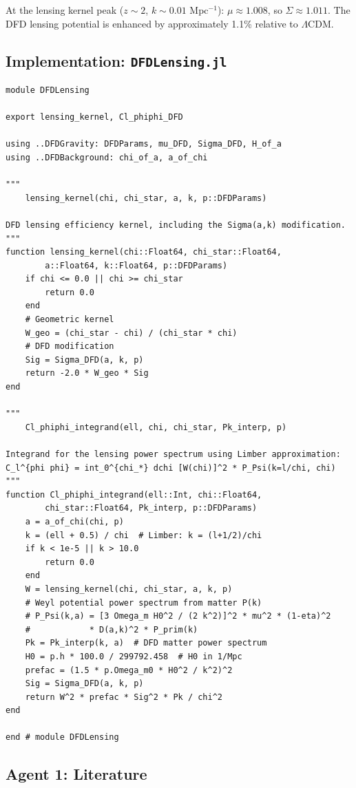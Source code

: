 \documentclass[11pt,a4paper]{article}
\begin{document}
At the lensing kernel peak ($z \sim 2$, $k \sim 0.01$ Mpc$^{-1}$): $\mu \approx 1.008$, so $\Sigma \approx 1.011$. The DFD lensing potential is enhanced by approximately 1.1\% relative to $\Lambda$CDM.

\subsection{Implementation: \texttt{DFDLensing.jl}}

\begin{lstlisting}[caption={DFDLensing.jl --- Lensing potential from dynamical $\psi$-field}]
module DFDLensing

export lensing_kernel, Cl_phiphi_DFD

using ..DFDGravity: DFDParams, mu_DFD, Sigma_DFD, H_of_a
using ..DFDBackground: chi_of_a, a_of_chi

"""
    lensing_kernel(chi, chi_star, a, k, p::DFDParams)

DFD lensing efficiency kernel, including the Sigma(a,k) modification.
"""
function lensing_kernel(chi::Float64, chi_star::Float64,
        a::Float64, k::Float64, p::DFDParams)
    if chi <= 0.0 || chi >= chi_star
        return 0.0
    end
    # Geometric kernel
    W_geo = (chi_star - chi) / (chi_star * chi)
    # DFD modification
    Sig = Sigma_DFD(a, k, p)
    return -2.0 * W_geo * Sig
end

"""
    Cl_phiphi_integrand(ell, chi, chi_star, Pk_interp, p)

Integrand for the lensing power spectrum using Limber approximation:
C_l^{phi phi} = int_0^{chi_*} dchi [W(chi)]^2 * P_Psi(k=l/chi, chi)
"""
function Cl_phiphi_integrand(ell::Int, chi::Float64,
        chi_star::Float64, Pk_interp, p::DFDParams)
    a = a_of_chi(chi, p)
    k = (ell + 0.5) / chi  # Limber: k = (l+1/2)/chi
    if k < 1e-5 || k > 10.0
        return 0.0
    end
    W = lensing_kernel(chi, chi_star, a, k, p)
    # Weyl potential power spectrum from matter P(k)
    # P_Psi(k,a) = [3 Omega_m H0^2 / (2 k^2)]^2 * mu^2 * (1-eta)^2
    #            * D(a,k)^2 * P_prim(k)
    Pk = Pk_interp(k, a)  # DFD matter power spectrum
    H0 = p.h * 100.0 / 299792.458  # H0 in 1/Mpc
    prefac = (1.5 * p.Omega_m0 * H0^2 / k^2)^2
    Sig = Sigma_DFD(a, k, p)
    return W^2 * prefac * Sig^2 * Pk / chi^2
end

end # module DFDLensing
\end{lstlisting}

\subsection{Agent 1: Literature}
\end{document}
